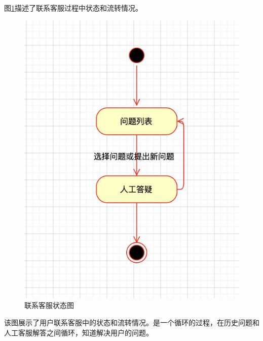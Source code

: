\documentclass[a4paper]{ctexart}
\begin{document}
图\ref{fig:联系客服状态图}描述了联系客服过程中状态和流转情况。
\begin{figure}[H]
\centering
\includegraphics[scale=0.4]{image/1_10状态图.png}
\caption{联系客服状态图}
\label{fig:联系客服状态图}
\end{figure}
该图展示了用户联系客服中的状态和流转情况。是一个循环的过程，在历史问题和人工客服解答之间循环，知道解决用户的问题。
\end{document}
